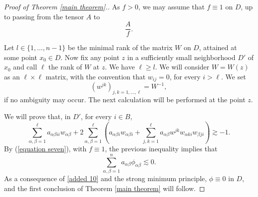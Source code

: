 \documentclass[12pt]{amsart}
\newcommand{\1}{\mathbf 1}
\begin{document}
\begin{proof}[Proof of Theorem \ref{main theorem}.] As $f>0$, we may assume that $f\equiv1$ on $D$, up to passing from the tensor $A$ to 
$$
\frac{A}f.
$$

\medskip

Let $l\in\{1,\dots,n-1\}$ be the minimal rank of the matrix $W$ on $D$, attained at some point $x_0\in D$. Now fix any point $z$ in a sufficiently small neighborhood $D'$ of $x_0$ and call $\ell$ the rank of $W$ at $z$. We have $\ell\geq l$. We will consider $W=W(z)$ as an $\ell\times\ell$ matrix, with the convention that $w_{ij}=0$, for every $i>\ell$. We set 
$$
(w^{jk})_{j,k=1,\dots,\ell}=W^{-1},
$$
if no ambiguity may occur. The next calculation will be performed at the point $z$.

We will prove that, in $D'$, for every $i\in B$, 
\begin{equation}\label{formula 5}
\sum_{\alpha,\beta=1}^{\ell} a_{\alpha\beta ii}w_{\alpha\beta}+2\sum_{\alpha,\beta=1}^\ell\left(
a_{\alpha\beta i}w_{\alpha\beta i}+\sum_{j,k=1}^{\ell} a_{\alpha\beta}w^{jk}w_{\alpha ki}w_{\beta ji}
\right)\gtrsim -1.
\end{equation}
By (\ref{equation seven}), with $f\equiv 1$, the previous inequality implies that 
\begin{equation}\label{added 10}
\sum_{\alpha,\beta=1}^na_{\alpha\beta}\phi_{\alpha\beta}\lesssim0.
\end{equation}
As a consequence of \eqref{added 10} and the strong minimum principle, $\phi\equiv0$ in $D$, and the first conclusion of Theorem \ref{main theorem} will follow.

\bigskip


\end{proof}
\end{document}
